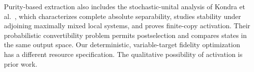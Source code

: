 Purity-based extraction also includes the stochastic-unital analysis of Kondra et al.\ \cite{kondra}, which characterizes complete absolute separability, studies stability under adjoining maximally mixed local systems, and proves finite-copy activation. Their probabilistic convertibility problem permits postselection and compares states in the same output space. Our deterministic, variable-target fidelity optimization has a different resource specification. The qualitative possibility of activation is prior work.
